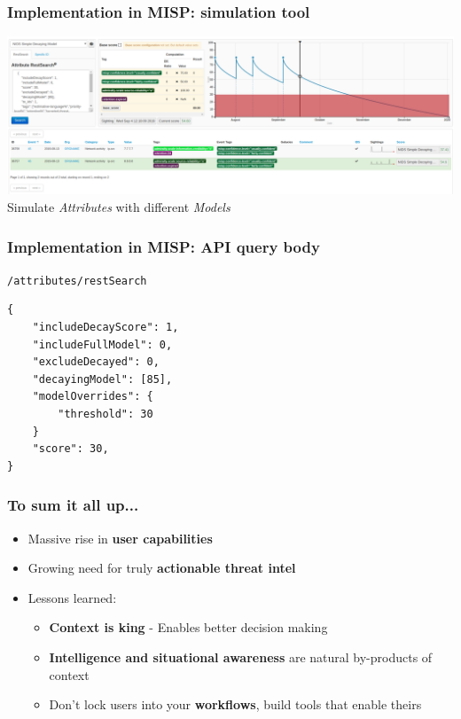 \begin{frame}
    \frametitle{Implementation in MISP: simulation tool}
    \includegraphics[width=1.00\linewidth]{decaying-simulation.png}
    Simulate \textit{Attributes} with different \textit{Models}
\end{frame}

\begin{frame}[fragile]
    \frametitle{Implementation in MISP: API query body}
    \texttt{/attributes/restSearch}
    \begin{lstlisting}
{
    "includeDecayScore": 1,
    "includeFullModel": 0,
    "excludeDecayed": 0,
    "decayingModel": [85],
    "modelOverrides": {
        "threshold": 30
    }
    "score": 30,
}
    \end{lstlisting}
\end{frame}

\begin{frame}
  \frametitle{To sum it all up...}
  \begin{itemize}
     \item Massive rise in {\bf user capabilities}
     \item Growing need for truly {\bf actionable threat intel}
     \item Lessons learned:
     \begin{itemize}
	\item {\bf Context is king} - Enables better decision making
        \item {\bf Intelligence and situational awareness} are natural by-products of context
        \item Don't lock users into your {\bf workflows}, build tools that enable theirs
     \end{itemize}
  \end{itemize}
\end{frame}

